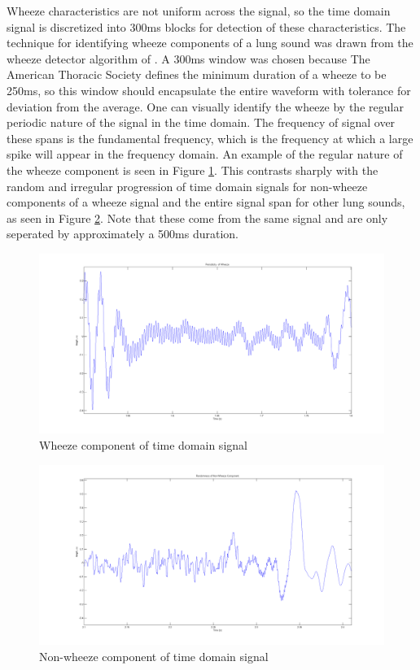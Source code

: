 \documentclass{article}
\begin{document}
Wheeze characteristics are not uniform across the signal, so the time domain signal is discretized into 300ms blocks for detection of these characteristics. The technique for identifying wheeze components of a lung sound was drawn from the wheeze detector algorithm of \cite{Yi MEng}. A 300ms window was chosen because The American Thoracic Society defines the minimum duration of a wheeze to be 250ms, so this window should encapsulate the entire waveform with tolerance for deviation from the average. One can visually identify the wheeze by the regular periodic nature of the signal in the time domain. The frequency of signal over these spans is the fundamental frequency, which is the frequency at which a large spike will appear in the frequency domain. An example of the regular nature of the wheeze component is seen in Figure \ref{fig:WheezePeriodicity}. This contrasts sharply with the random and irregular progression of time domain signals for non-wheeze components of a wheeze signal and the entire signal span for other lung sounds, as seen in Figure \ref{fig:WheezeRandomness}. Note that these come from the same signal and are only seperated by approximately a 500ms duration. \\

\begin{figure}[H]
	\includegraphics[width=\linewidth]{images/WheezePeriodicity.png}
	\caption{Wheeze component of time domain signal}
 	\label{fig:WheezePeriodicity}
\end{figure}
\begin{figure}[H]
	\includegraphics[width=\linewidth]{images/WheezeRandomness.png}
	\caption{Non-wheeze component of time domain signal}
 	\label{fig:WheezeRandomness}
\end{figure}
\end{document}
